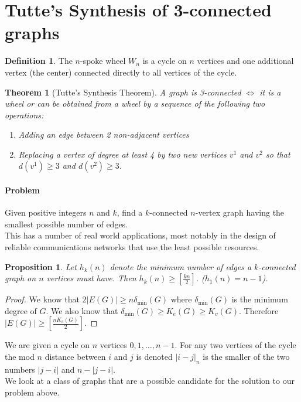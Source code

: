 \documentclass{article}
\newtheorem*{thm}{Theorem}
\newtheorem*{prop}{Proposition}
\theoremstyle{definition}
\newtheorem*{defn}{Definition}
\begin{document}
\section{Tutte's Synthesis of 3-connected graphs}
\begin{defn}
The $n$-spoke wheel $W_n$ is a cycle on $n$ vertices and one additional vertex (the center) connected directly to all vertices of the cycle.
\end{defn}

\begin{thm}[Tutte's Synthesis Theorem]
A graph is 3-connected $\iff$ it is a wheel or can be obtained from a wheel by a sequence of the following two operations:
\begin{enumerate}
\item Adding an edge between 2 non-adjacent vertices
\item Replacing a vertex of degree at least 4 by two new vertices $v^1$ and $v^2$ so that $d(v^1) \ge 3$ and $d(v^2)\ge 3$.
\end{enumerate}
\end{thm}

\paragraph{Problem} Given positive integers $n$ and $k$, find a $k$-connected $n$-vertex graph having the smallest possible number of edges. \\
This has a number of real world applications, most notably in the design of reliable communications networks that use the least possible resources.


\begin{prop}
Let $h_k(n)$ denote the minimum number of edges a $k$-connected graph on $n$ vertices must have.
Then $h_k(n) \ge \left[\frac{kn}{2}\right]$. 
($h_1(n) = n-1$).
\end{prop}

\begin{proof}
We know that $2|E(G)| \ge  n\delta_{\text{min}}(G)$ where $\delta_{\text{min}}(G)$ is the minimum degree of $G$.
We also know that $\delta_{\text{min}}(G) \ge K_e(G) \ge K_v(G)$.
Therefore $|E(G)| \ge \left[\frac{nK_v(G)}{2}\right]$.
\end{proof}

We are given a cycle on $n$ vertices $0,1,\ldots,n-1$.
For any two vertices of the cycle the mod $n$ distance between $i$ and $j$ is denoted $|i-j|_n$ is the smaller of the two numbers $|j-i|$ and $n-|j-i|$. \\
We look at a class of graphs that are a possible candidate for the solution to our problem above.
\end{document}
